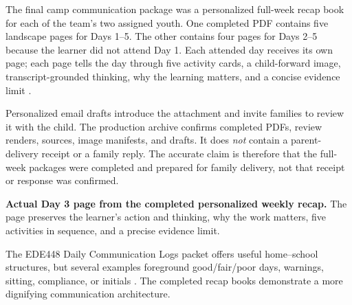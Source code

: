 

The final camp communication package was a personalized full-week recap book for each of the team's two assigned youth. One completed PDF contains five landscape pages for Days 1--5. The other contains four pages for Days 2--5 because the learner did not attend Day 1. Each attended day receives its own page; each page tells the day through five activity cards, a child-forward image, transcript-grounded thinking, why the learning matters, and a concise evidence limit \citep{campEvidence2026}.

Personalized email drafts introduce the attachment and invite families to review it with the child. The production archive confirms completed PDFs, review renders, sources, image manifests, and drafts. It does \emph{not} contain a parent-delivery receipt or a family reply. The accurate claim is therefore that the full-week packages were completed and prepared for family delivery, not that receipt or response was confirmed.


\begin{center}

	\vspace{0.02in}
	\parbox{0.92\textwidth}{\centering\small\textbf{Actual Day 3 page from the completed personalized weekly recap.} The page preserves the learner's action and thinking, why the work matters, five activities in sequence, and a precise evidence limit.}
\end{center}

\newpage
\small
{}

The EDE448 Daily Communication Logs packet offers useful home--school structures, but several examples foreground good/fair/poor days, warnings, sitting, compliance, or initials \citep{dailylogs2009}. The completed recap books demonstrate a more dignifying communication architecture.

